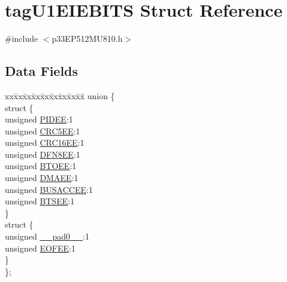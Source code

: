 \hypertarget{structtag_u1_e_i_e_b_i_t_s}{}\section{tag\+U1\+E\+I\+E\+B\+I\+TS Struct Reference}
\label{structtag_u1_e_i_e_b_i_t_s}


{\ttfamily \#include $<$p33\+E\+P512\+M\+U810.\+h$>$}

\subsection*{Data Fields}
\begin{DoxyCompactItemize}
\item 
\begin{tabbing}
xx\=xx\=xx\=xx\=xx\=xx\=xx\=xx\=xx\=\kill
union \{\\
\>struct \{\\
\>\>unsigned \hyperlink{structtag_u1_e_i_e_b_i_t_s_a183ec43af8dfd0a97051d372cbe49866}{PIDEE}:1\\
\>\>unsigned \hyperlink{structtag_u1_e_i_e_b_i_t_s_aeb00bb174be7306449de8020ea0511bf}{CRC5EE}:1\\
\>\>unsigned \hyperlink{structtag_u1_e_i_e_b_i_t_s_ab269a2f518e0af26f8cddf940e84469a}{CRC16EE}:1\\
\>\>unsigned \hyperlink{structtag_u1_e_i_e_b_i_t_s_a9558139f561376493e10225bd4cf4567}{DFN8EE}:1\\
\>\>unsigned \hyperlink{structtag_u1_e_i_e_b_i_t_s_a343a8dacfaa5d6cda73f6c8e5ee8d9b4}{BTOEE}:1\\
\>\>unsigned \hyperlink{structtag_u1_e_i_e_b_i_t_s_a83880c11ccdaa64d4d026b2f2889f32c}{DMAEE}:1\\
\>\>unsigned \hyperlink{structtag_u1_e_i_e_b_i_t_s_adf4a08ca31b4fc2c8e7db48cd876033c}{BUSACCEE}:1\\
\>\>unsigned \hyperlink{structtag_u1_e_i_e_b_i_t_s_a9b68de76904306b37b899c2cd7f800f6}{BTSEE}:1\\
\>\} \\
\>struct \{\\
\>\>unsigned \hyperlink{structtag_u1_e_i_e_b_i_t_s_adf71f3d8410c1f1dbbc96680a92c49af}{\_\_pad0\_\_}:1\\
\>\>unsigned \hyperlink{structtag_u1_e_i_e_b_i_t_s_ad9469995174bbcfc742bcb66cd84f1c9}{EOFEE}:1\\
\>\} \\
\}; \\

\end{tabbing}\end{DoxyCompactItemize}


